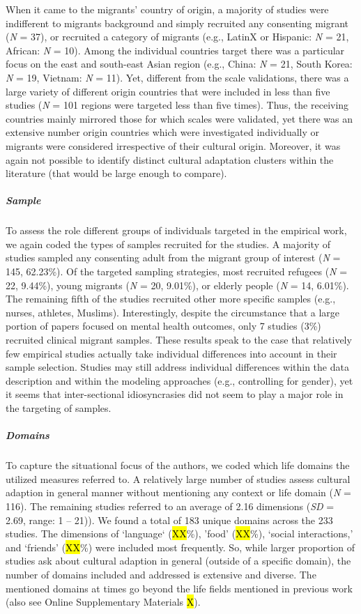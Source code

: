 When it came to the migrants' country of origin, a majority of studies
were indifferent to migrants background and simply recruited any
consenting migrant (\textit{N} = 37), or recruited a category of
migrants (e.g., LatinX or Hispanic: \textit{N} = 21, African: \textit{N}
= 10). Among the individual countries target there was a particular
focus on the east and south-east Asian region (e.g., China: \textit{N} =
21, South Korea: \textit{N} = 19, Vietnam: \textit{N} = 11). Yet,
different from the scale validations, there was a large variety of
different origin countries that were included in less than five studies
(\textit{N} = 101 regions were targeted less than five times). Thus, the
receiving countries mainly mirrored those for which scales were
validated, yet there was an extensive number origin countries which were
investigated individually or migrants were considered irrespective of
their cultural origin. Moreover, it was again not possible to identify
distinct cultural adaptation clusters within the literature (that would
be large enough to compare).

\subparagraph{Sample}

To assess the role different groups of individuals targeted in the
empirical work, we again coded the types of samples recruited for the
studies. A majority of studies sampled any consenting adult from the
migrant group of interest (\textit{N} = 145, 62.23\%). Of the targeted
sampling strategies, most recruited refugees (\textit{N} = 22, 9.44\%),
young migrants (\textit{N} = 20, 9.01\%), or elderly people (\textit{N}
= 14, 6.01\%). The remaining fifth of the studies recruited other more
specific samples (e.g., nurses, athletes, Muslims). Interestingly,
despite the circumstance that a large portion of papers focused on
mental health outcomes, only 7 studies (3\%) recruited clinical migrant
samples. These results speak to the case that relatively few empirical
studies actually take individual differences into account in their
sample selection. Studies may still address individual differences
within the data description and within the modeling approaches (e.g.,
controlling for gender), yet it seems that inter-sectional
idiosyncrasies did not seem to play a major role in the targeting of
samples.

\subparagraph{Domains}

To capture the situational focus of the authors, we coded which life
domains the utilized measures referred to. A relatively large number of
studies assess cultural adaption in general manner without mentioning
any context or life domain (\textit{N} = 116). The remaining studies
referred to an average of 2.16 dimensions (\textit{SD} = 2.69, range: 1
-- 21)). We found a total of 183 unique domains across the 233 studies.
The dimensions of `language` (\hl{XX}\%), 'food' (\hl{XX}\%), `social
interactions,' and `friends' (\hl{XX}\%) were included most frequently.
So, while larger proportion of studies ask about cultural adaption in
general (outside of a specific domain), the number of domains included
and addressed is extensive and diverse. The mentioned domains at times
go beyond the life fields mentioned in previous work (also see Online
Supplementary Materials \hl{X}).

